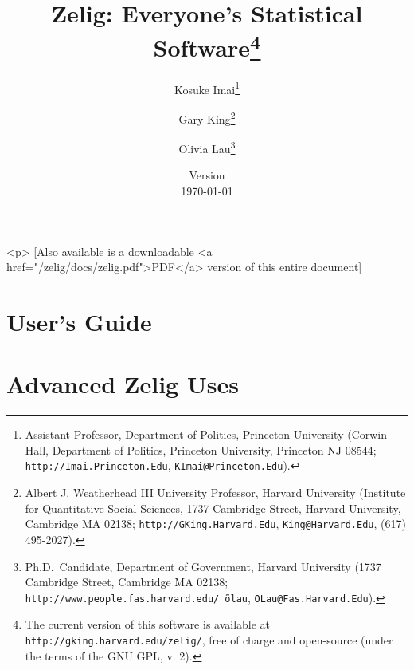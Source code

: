 
\usepackage{Sweave}
\title{Zelig: Everyone's Statistical Software\thanks{The current
    version of this software is available at
    \texttt{http://gking.harvard.edu/zelig/}, free of charge and
    open-source (under the terms of the GNU GPL, v. 2).}}
\author{Kosuke
  Imai\thanks{Assistant Professor, Department of Politics, Princeton
    University (Corwin Hall, Department of Politics, Princeton
    University, Princeton NJ 08544; \texttt{http://Imai.Princeton.Edu},
    \texttt{KImai@Princeton.Edu}).}
\and %
Gary King\thanks{Albert J. Weatherhead III University Professor, Harvard
  University (Institute for Quantitative Social Sciences, 1737 Cambridge 
Street, Harvard University, Cambridge MA 02138;
  \texttt{http://GKing.Harvard.Edu}, \texttt{King@Harvard.Edu}, (617)
  495-2027).}
\and %
Olivia Lau\thanks{Ph.D.\ Candidate, Department of Government, Harvard
  University (1737 Cambridge Street, Cambridge MA 02138;
  \texttt{http://www.people.fas.harvard.edu/\~\,olau},
  \texttt{OLau@Fas.Harvard.Edu}).}}

\date{Version \\ \today}


\maketitle
\begin{rawhtml}
  <p>
  [Also available is a downloadable <a href="/zelig/docs/zelig.pdf">PDF</a>
  version of this entire document]
\end{rawhtml}

\tableofcontents

\nobibliography*





\part[User's Guide]{User's Guide}






\part{Advanced Zelig Uses}






